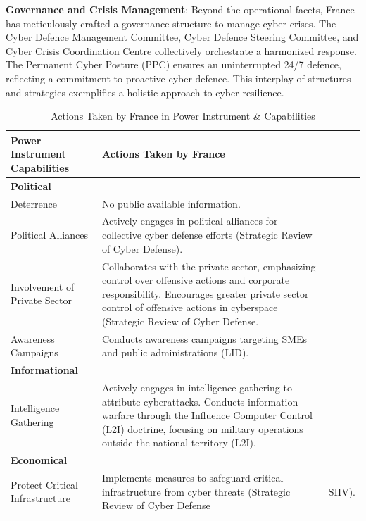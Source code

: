 \textbf{Governance and Crisis Management}: Beyond the operational facets, France has meticulously crafted a governance structure to manage cyber crises. The Cyber Defence Management Committee, Cyber Defence Steering Committee, and Cyber Crisis Coordination Centre collectively orchestrate a harmonized response. The Permanent Cyber Posture (PPC) ensures an uninterrupted 24/7 defence, reflecting a commitment to proactive cyber defence. This interplay of structures and strategies exemplifies a holistic approach to cyber resilience.

\begin{table}[h]
\centering
\renewcommand{\arraystretch}{1.5} %
\caption{Actions Taken by France in Power Instrument \& Capabilities}
\begin{tabular}{>{\raggedright}p{4cm} p{11cm}}
\toprule
\textbf{Power Instrument Capabilities} & \textbf{Actions Taken by France} \\
\midrule
\textbf{Political} & \\
\hspace{0.2cm} Deterrence & No public available information. \\
\hspace{0.2cm} Political Alliances & Actively engages in political alliances for collective cyber defense efforts (Strategic Review of Cyber Defense). \\
\hspace{0.2cm} Involvement of Private Sector & Collaborates with the private sector, emphasizing control over offensive actions and corporate responsibility. Encourages greater private sector control of offensive actions in cyberspace (Strategic Review of Cyber Defense. \\
\hspace{0.2cm} Awareness Campaigns & Conducts awareness campaigns targeting SMEs and public administrations (LID). \\
\midrule
\textbf{Informational} & \\
\hspace{0.2cm} Intelligence Gathering & Actively engages in intelligence gathering to attribute cyberattacks. Conducts information warfare through the Influence Computer Control (L2I) doctrine, focusing on military operations outside the national territory (L2I). \\
\midrule
\textbf{Economical} & \\
\hspace{0.2cm} Protect Critical Infrastructure & Implements measures to safeguard critical infrastructure from cyber threats (Strategic Review of Cyber Defense & SIIV). \\

\end{tabular}
\end{table}
